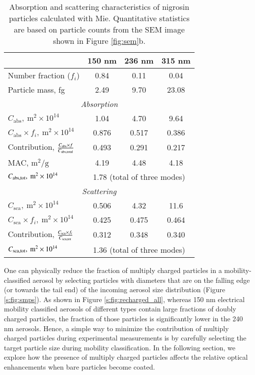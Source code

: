\begin{table}[htp]
    \centering
    \caption{Absorption and scattering characteristics of nigrosin particles calculated with Mie. Quantitative statistics are based on particle counts from the SEM image shown in Figure \ref{fig:sem}b.}
    \begin{tabular}{l c c c}
        \hline
        & 150 nm & 236 nm & 315 nm \\
        \hline
        Number fraction ($f_i$) & 0.84 & 0.11 & 0.04 \\
        Particle mass, fg & 2.49 & 9.70 & 23.08 \\
        \multicolumn{4}{c}{\textit{Absorption}} \\
        \hline
        $C_{\mathrm{abs}},\ \mathrm{m}^2\times10^{14}$ & 1.04 & 4.70 & 9.64 \\
        $C_{\mathrm{abs}}\times f_i,\ \mathrm{m}^2\times10^{14}$ & 0.876 & 0.517 & 0.386 \\
        Contribution, $C_{\mathrm{abs}}\times f\over C_{\mathrm{abs,total}}$ & 0.493 & 0.291 & 0.217 \\
        MAC, $\mathrm{m}^2/\mathrm{g}$ & 4.19 & 4.48 & 4.18 \\
        $C_{\rm abs,tot},\ \rm m^2\times10^{14}$ & \multicolumn{3}{c}{1.78 (total of three modes)} \\
        \multicolumn{4}{c}{\textit{Scattering}} \\
        \hline
        $C_\mathrm{sca},\ \mathrm{m}^2\times 10^{14}$ & 0.506 & 4.32 & 11.6 \\
        $C_\mathrm{sca}\times f_i,\ \mathrm{m}^2\times 10^{14}$ & 0.425 & 0.475 & 0.464 \\
        Contribution, $C_\mathrm{sca}\times f_i\over C_\mathrm{sca,tot}$ & 0.312 & 0.348 & 0.340 \\
        $C_{\rm sca,tot},\ \rm m^2\times10^{14}$ & \multicolumn{3}{c}{1.36 (total of three modes)} \\
        \hline
    \end{tabular}
    \label{tab:absorption_mie}
\end{table}

One can physically reduce the fraction of multiply charged particles in a mobility-classified aerosol by selecting particles with diameters that are on the falling edge (or towards the tail end) of the incoming aerosol size distribution (Figure \ref{s:fig:smps}). As shown in Figure \ref{s:fig:recharged_all}, whereas 150 nm electrical mobility classified aerosols of different types contain large fractions of doubly charged particles, the fraction of those particles is significantly lower in the 240 nm aerosols. Hence, a simple way to minimize the contribution of multiply charged particles during experimental measurements is by carefully selecting the target particle size during mobility classification. In the following section, we explore how the presence of multiply charged particles affects the relative optical enhancements when bare particles become coated.

